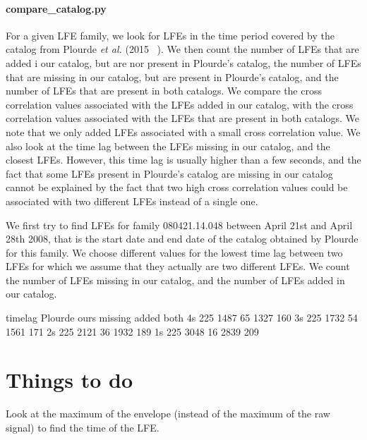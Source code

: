 \documentclass[workdone.tex]{subfiles}
\begin{document}
\paragraph{compare\_catalog.py} For a given LFE family, we look for LFEs in the time period covered by the catalog from Plourde \textit{et al.} (2015 ~\cite{PLO_2015}). We then count the number of LFEs that are added i our catalog, but are nor present in Plourde's catalog, the number of LFEs that are missing in our catalog, but are present in Plourde's catalog, and the number of LFEs that are present in both catalogs. We compare the cross correlation values associated with the LFEs added in our catalog, with the cross correlation values associated with the LFEs that are present in both catalogs. We note that we only added LFEs associated with a small cross correlation value. We also look at the time lag between the LFEs missing in our catalog, and the closest LFEs. However, this time lag is usually higher than a few seconds, and the fact that some LFEs present in Plourde's catalog are missing in our catalog cannot be explained by the fact that two high cross correlation values could be associated with two different LFEs instead of a single one.

We first try to find LFEs for family 080421.14.048 between April 21st and April 28th 2008, that is the start date and end date of the catalog obtained by Plourde for this family. We choose different values for the lowest time lag between two LFEs for which we assume that they actually are two different LFEs. We count the number of LFEs missing in our catalog, and the number of LFEs added in our catalog.

timelag Plourde ours missing added both
4s 225 1487 65 1327 160
3s 225 1732 54 1561 171
2s 225 2121 36 1932 189
1s 225 3048 16 2839 209

\section{Things to do}

Look at the maximum of the envelope (instead of the maximum of the raw signal) to find the time of the LFE.
\end{document}
